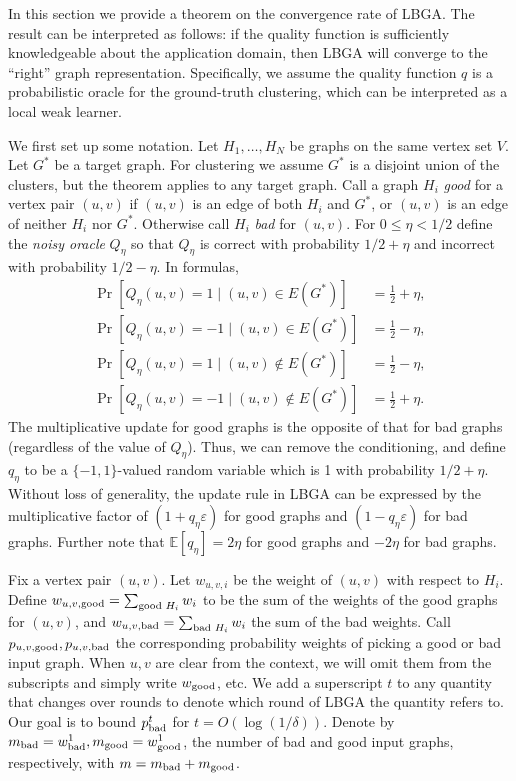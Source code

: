 \documentclass{IEEEtran}
\begin{document}
In this section we provide a theorem on the convergence rate of LBGA. The
result can be interpreted as follows: if the quality function is sufficiently
knowledgeable about the application domain, then LBGA will converge to the
``right'' graph representation. Specifically, we assume the quality function
$q$ is a probabilistic oracle for the ground-truth clustering, which can be
interpreted as a local weak learner.  

We first set up some notation. Let $H_1, \dots, H_N$ be graphs on the same
vertex set $V$. Let $G^*$ be a target graph. For clustering we assume $G^*$ is
a disjoint union of the clusters, but the theorem applies to any target graph.
Call a graph $H_i$ \emph{good} for a vertex pair $(u,v)$ if $(u,v)$ is an edge
of both $H_i$ and $G^*$, or $(u,v)$ is an edge of neither $H_i$ nor $G^*$.
Otherwise call $H_i$ \emph{bad} for $(u,v)$. For $0 \leq \eta < 1/2$ define the
\emph{noisy oracle} $Q_\eta$ so that $Q_\eta$ is correct with probability $1/2
+ \eta$ and incorrect with probability $1/2 - \eta$. In formulas,
\[
   \begin{aligned}
   \Pr[Q_\eta(u,v) = 1  \mid (u,v) \in E(G^*)]      &= \frac{1}{2} + \eta, \\ 
   \Pr[Q_\eta(u,v) = -1 \mid (u,v) \in E(G^*)]      &= \frac{1}{2} - \eta, \\ 
   \Pr[Q_\eta(u,v) = 1  \mid (u,v) \not \in E(G^*)] &= \frac{1}{2} - \eta,\\
   \Pr[Q_\eta(u,v) = -1 \mid (u,v) \not \in E(G^*)] &= \frac{1}{2} + \eta.
   \end{aligned}
\]
The multiplicative update for good graphs is the opposite of that for bad
graphs (regardless of the value of $Q_\eta$). Thus, we can remove the
conditioning, and define $q_\eta$ to be a $\{ -1 , 1 \}$-valued random variable
which is 1 with probability $1/2 + \eta$. Without loss of generality, the
update rule in LBGA can be expressed by the multiplicative factor of $(1 +
q_{\eta} \varepsilon)$ for good graphs and $(1 - q_\eta \varepsilon)$ for bad
graphs. Further note that $\mathbb{E}[q_\eta] = 2\eta$ for good graphs and
$-2\eta$ for bad graphs.

Fix a vertex pair $(u,v)$. Let $w_{u,v,i}$ be the weight of $(u,v)$  with
respect to $H_i$.  Define $w_{u,v,\textup{good}} = \sum_{\textup{good } H_i}
w_i$ to be the sum of the weights of the good graphs for $(u,v)$, and
$w_{u,v,\textup{bad}} = \sum_{\textup{bad } H_i} w_i$ the sum of the bad
weights. Call $p_{u,v,\textup{good}}, p_{u,v,\textup{bad}}$ the corresponding
probability weights of picking a good or bad input graph. When $u,v$ are clear
from the context, we will omit them from the subscripts and simply write
$w_{\textup{good}}$, etc. We add a superscript $t$ to any quantity that changes
over rounds to denote which round of LBGA the quantity refers to. Our goal is
to bound $p_{\textup{bad}}^t$ for $t = O(\log(1/ \delta))$. Denote by
$m_{\textup{bad}} = w_{\textup{bad}}^1, m_{\textup{good}} =
w^1_{\textup{good}}$, the number of bad and good input graphs, respectively,
with $m = m_{\textup{bad}} + m_{\textup{good}}$. 
\end{document}
